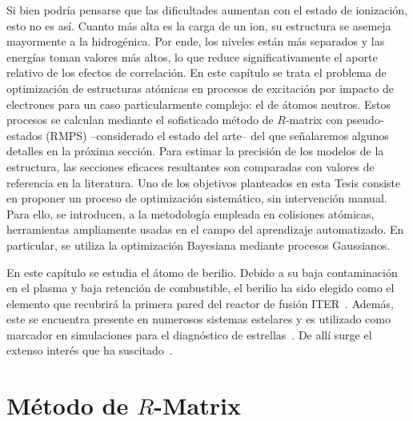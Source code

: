 Si bien podría pensarse que las dificultades aumentan con el estado de 
ionización, esto no es así. Cuanto más alta es la carga de un ion, su 
estructura se asemeja mayormente a la hidrogénica. Por ende, los niveles 
están más separados y las energías toman valores más altos, lo que 
reduce significativamente el aporte relativo de los efectos de 
correlación. En este capítulo se trata el problema de optimización de 
estructuras atómicas en procesos de excitación por impacto de electrones 
para un caso particularmente complejo: el de átomos neutros. Estos 
procesos se calculan mediante el sofisticado método de $R$-matrix con 
pseudo-estados (RMPS) --considerado el estado del arte-- del que 
señalaremos algunos detalles en la próxima sección. Para estimar la 
precisión de los modelos de la estructura, las secciones eficaces 
resultantes son comparadas con valores de referencia en la literatura. 
Uno de los objetivos planteados en esta Tesis consiste en proponer un 
proceso de optimización sistemático, sin intervención manual. Para ello, 
se introducen, a la metodología empleada en colisiones atómicas, 
herramientas ampliamente usadas en el campo del aprendizaje 
automatizado. En particular, se utiliza la optimización Bayesiana 
mediante procesos Gaussianos. 

En este capítulo se estudia el átomo de berilio. Debido a su baja 
contaminación en el plasma y baja retención de combustible, el berilio 
ha sido elegido como el elemento que recubrirá la primera pared del 
reactor de fusión ITER~\cite{Ikeda:07,Rubel:08}. Además, este se 
encuentra presente en numerosos sistemas estelares y es utilizado como 
marcador en simulaciones para el diagnóstico de 
estrellas~\cite{Deliyannis:00}. De allí surge el extenso interés que ha 
suscitado~\cite{Be_Ballance:03,Bartschat:97,Colgan:03,Fursa:97,Bray:15,
Zatsarinny:16,Blanco:17}. 

\section{Método de $R$-Matrix}
\label{sec:proc-rmatrix}

